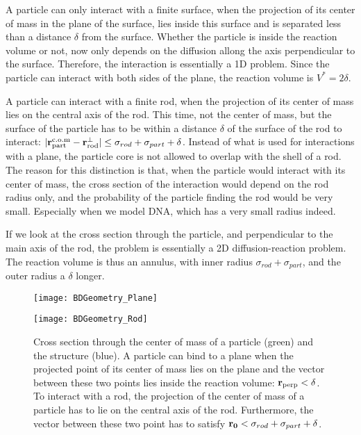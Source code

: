 A particle can only interact with a finite surface, when the projection of its center of mass in the plane of the surface, lies inside this surface and is separated less than a distance $\delta$ from the surface. Whether the particle is inside the reaction volume or not, now only depends on the diffusion allong the axis perpendicular to the surface. Therefore, the interaction is essentially a 1D problem. Since the particle can interact with both sides of the plane, the reaction volume is $V^*=2 \delta$.

A particle can interact with a finite rod, when the projection of its center of mass lies on the central axis of the rod. This time, not the center of mass, but the surface of the particle has to be within a distance $\delta$ of the surface of the rod to interact: $|{\bf r}_{\rm part}^{\rm c.o.m}-{\bf r}_{\rm rod}^{\perp}| \leq \sigma_{rod}+\sigma_{part} + \delta$. Instead of what is used for interactions with a plane, the particle core is not allowed to overlap with the shell of a rod. The reason for this distinction is that, when the particle would interact with its center of mass, the cross section of the interaction would depend on the rod radius only, and the probability of the particle finding the rod would be very small. Especially when we model DNA, which has a very small radius indeed.

If we look at the cross section through the particle, and perpendicular to the main axis of the rod, the problem is essentially a 2D diffusion-reaction problem. The reaction volume is thus an annulus, with inner radius $\sigma_{rod} + \sigma_{part}$, and the outer radius a $\delta$ longer.

\begin{figure}[ht]
\begin{minipage}[ht]{.5\linewidth}
\centering
\texttt{[image: BDGeometry\_Plane]}
\end{minipage}
\begin{minipage}[ht]{.5\linewidth}
\centering
\texttt{[image: BDGeometry\_Rod]}
\end{minipage}
\caption{ Cross section through the center of mass of a particle (green) and the structure (blue). A particle can bind to a plane when the projected point of its center of mass lies on the plane and the vector between these two points lies inside the reaction volume: ${\bf r}_{\rm perp}<\delta$. To interact with a rod, the projection of the center of mass of a particle has to lie on the central axis of the rod. Furthermore, the vector between these two point has to satisfy ${\bf r_0} < \sigma_{rod} + \sigma_{part} + \delta$.}
\end{figure}


